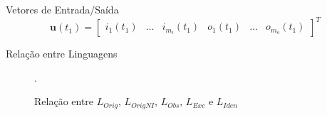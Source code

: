 \begin{frame}
Vetores de Entrada/Saída  
\begin{equation*}
\mathbf{u}(t_1)=
\begin{bmatrix}
  i_1(t_1)&
  \dots&
  i_{m_i}(t_1)&
  o_1(t_1)&
  \dots&
  o_{m_o}(t_1)
\end{bmatrix}^T
\end{equation*}
\end{frame}
\begin{frame}{Relação entre Linguagens}
  \begin{figure}[H]
 \begin{minipage}{1.2\wd0}
  \centering
   \caption{Relação entre $L_{Orig}$, $L_{OrigNI}$,
    $L_{Obs}$, $L_{Exc}$ e $L_{Iden}$}.
 \end{minipage}
  \label{fig:languagesVenn}
\end{figure}
\end{frame}

